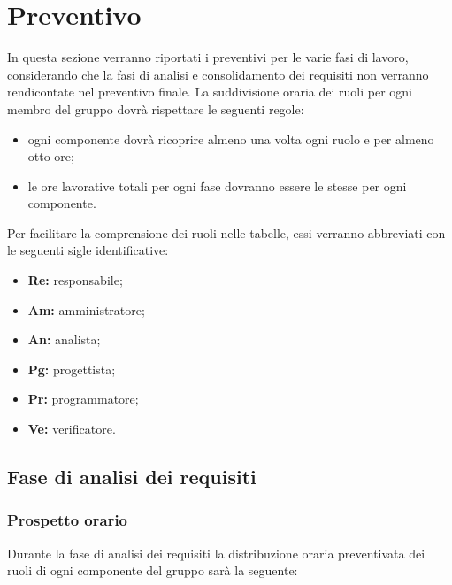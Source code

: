 \section{Preventivo}
	In questa sezione verranno riportati i preventivi per le varie fasi di lavoro, considerando che la fasi di analisi e consolidamento dei requisiti non verranno rendicontate nel preventivo finale. 
	La suddivisione oraria dei ruoli per ogni membro del gruppo dovrà rispettare le seguenti regole:
		\begin{itemize}
		\item ogni componente dovrà ricoprire almeno una volta ogni ruolo e per almeno otto ore;
		\item le ore lavorative totali per ogni fase dovranno essere le stesse per ogni componente.
	\end{itemize}
	 Per facilitare la comprensione dei ruoli nelle tabelle, essi verranno abbreviati con le seguenti sigle identificative:
			\begin{itemize}
			\item\textbf{Re:} responsabile;
			\item\textbf{Am:} amministratore;
			\item\textbf{An:} analista;
			\item\textbf{Pg:} progettista;
			\item\textbf{Pr:} programmatore;
			\item\textbf{Ve:} verificatore.
		\end{itemize}
	
	
	
	\subsection{Fase di analisi dei requisiti}
		\subsubsection{Prospetto orario}
			Durante la fase di analisi dei requisiti la distribuzione oraria preventivata dei ruoli di ogni componente del gruppo sarà la seguente:
			
